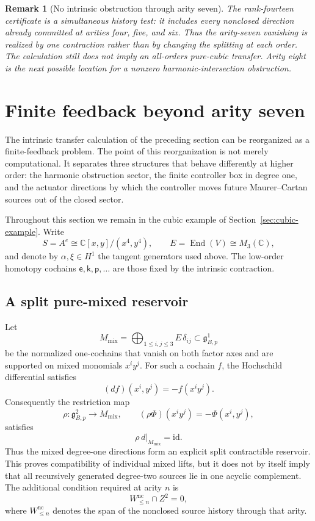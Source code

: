 \documentclass[11pt]{amsart}
\newtheorem{remark}[theorem]{Remark}
\newcommand{\End}{\operatorname{End}}
\newcommand{\C}{\mathbb C}
\newcommand{\ghoch}{\mathfrak g}
\begin{document}
\begin{remark}[No intrinsic obstruction through arity seven]\label{rem:no-obstruction-through-seven}
The rank-fourteen certificate is a simultaneous history test: it includes every nonclosed direction already committed at arities four, five, and six.  Thus the arity-seven vanishing is realized by one contraction rather than by changing the splitting at each order.  The calculation still does not imply an all-orders pure-cubic transfer.  Arity eight is the next possible location for a nonzero harmonic-intersection obstruction.
\end{remark}


\section{Finite feedback beyond arity seven}\label{sec:finite-feedback}

The intrinsic transfer calculation of the preceding section can be reorganized as a finite-feedback problem.  The point of this reorganization is not merely computational.  It separates three structures that behave differently at higher order: the harmonic obstruction sector, the finite controller box in degree one, and the actuator directions by which the controller moves future Maurer--Cartan sources out of the closed sector.

Throughout this section we remain in the cubic example of Section~\ref{sec:cubic-example}.  Write
\[
S=A^e\cong \C[x,y]/(x^4,y^4),
\qquad
E=\End(V)\cong M_3(\C),
\]
and denote by $\alpha,\xi\in H^1$ the tangent generators used above.  The low-order homotopy cochains $\mathsf e,\mathsf k,\mathsf p,\ldots$ are those fixed by the intrinsic contraction.

\subsection{A split pure-mixed reservoir}

Let
\[
M_{\mathrm{mix}}
=
\bigoplus_{1\le i,j\le3}E\,\delta_{ij}
\subset \ghoch^1_{B,p}
\]
be the normalized one-cochains that vanish on both factor axes and are supported on mixed monomials $x^iy^j$.  For such a cochain $f$, the Hochschild differential satisfies
\[
(d f)(x^i,y^j)=-f(x^iy^j).
\]
Consequently the restriction map
\[
\rho:\ghoch^2_{B,p}\longrightarrow M_{\mathrm{mix}},
\qquad
(\rho\Phi)(x^iy^j)=-\Phi(x^i,y^j),
\]
satisfies
\begin{equation}\label{eq:split-mixed}
\boxed{\rho\,d|_{M_{\mathrm{mix}}}=\mathrm{id}.}
\end{equation}
Thus the mixed degree-one directions form an explicit split contractible reservoir.  This proves compatibility of individual mixed lifts, but it does not by itself imply that all recursively generated degree-two sources lie in one acyclic complement.  The additional condition required at arity $n$ is
\[
W_{\le n}^{\mathrm{nc}}\cap Z^2=0,
\]
where $W_{\le n}^{\mathrm{nc}}$ denotes the span of the nonclosed source history through that arity.
\end{document}
